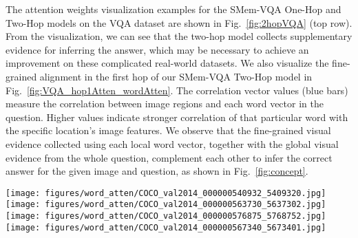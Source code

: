 The attention weights visualization examples for the SMem-VQA One-Hop and Two-Hop models on the VQA dataset are shown in Fig.~\ref{fig:2hopVQA} (top row). From the visualization, we can see that the two-hop model collects supplementary evidence for inferring the answer, which may be necessary to achieve an improvement on these complicated real-world datasets. We also visualize the fine-grained alignment in the first hop of our SMem-VQA Two-Hop model in Fig.~\ref{fig:VQA_hop1Atten_wordAtten}. 
The correlation vector values (blue bars) measure the correlation between image regions and each word vector in the question. Higher values indicate stronger correlation of that particular word with the specific location's image features. We observe that the fine-grained visual evidence collected using each local word vector, together with the global visual evidence from the whole question, complement each other to infer the correct answer for the given image and question, as shown in Fig.~\ref{fig:concept}.


\begin{figure*}[t]
  \texttt{[image: figures/word\_atten/COCO\_val2014\_000000540932\_5409320.jpg]}
  \texttt{[image: figures/word\_atten/COCO\_val2014\_000000563730\_5637302.jpg]}\\
  \texttt{[image: figures/word\_atten/COCO\_val2014\_000000576875\_5768752.jpg]}
  \texttt{[image: figures/word\_atten/COCO\_val2014\_000000567340\_5673401.jpg]}
\vspace{-0.3in}
\caption{
Visualization of the original image (left), the spatial attention weights  in the first hop (middle) and one correlation vector from the correlation matrix  for the location with highest attention weight in the SMem-VQA Two-Hop model on the VQA dataset.
Higher values in the correlation  vector indicate  stronger correlation of that word with the chosen location's image features.}
\label{fig:VQA_hop1Atten_wordAtten}
\vspace{-0.15in}
\end{figure*}




 





